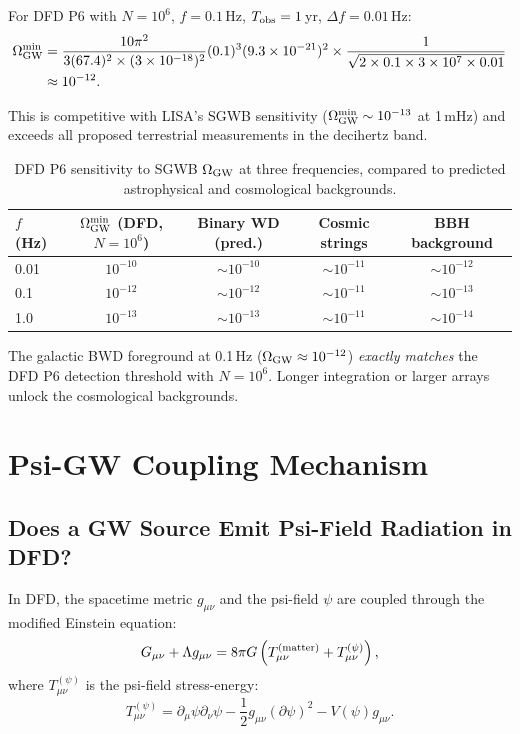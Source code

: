 \documentclass[11pt]{article}
\theoremstyle{definition}
\theoremstyle{remark}
\newcommand{\ee}[1]{\times10^{#1}}
\begin{document}
For DFD P6 with $N=10^6$, $f=0.1$\,Hz, $T_{\rm obs} = 1$\,yr,
$\Delta f = 0.01$\,Hz:
\begin{align}
\Omega_{\rm GW}^{\min} &= \frac{10\pi^2}{3 (67.4)^2 \times (3\ee{-18})^2}
(0.1)^3 (9.3\ee{-21})^2
\times \frac{1}{\sqrt{2 \times 0.1 \times 3\ee{7} \times 0.01}} \notag \\
&\approx 10^{-12}.
\end{align}

This is competitive with LISA's SGWB sensitivity ($\Omega_{\rm GW}^{\min}
\sim 10^{-13}$ at 1\,mHz) and exceeds all proposed terrestrial measurements
in the decihertz band.

\begin{table}[h]
\centering
\caption{DFD P6 sensitivity to SGWB $\Omega_{\rm GW}$ at three frequencies,
compared to predicted astrophysical and cosmological backgrounds.}
\label{tab:SGWB}
\begin{tabular}{@{}lcccc@{}}
\toprule
$f$ (Hz) & $\Omega_{\rm GW}^{\min}$ (DFD, $N=10^6$) & Binary WD (pred.) & Cosmic strings & BBH background \\
\midrule
0.01 & $10^{-10}$ & $\sim 10^{-10}$ & $\sim 10^{-11}$ & $\sim 10^{-12}$ \\
0.1  & $10^{-12}$ & $\sim 10^{-12}$ & $\sim 10^{-11}$ & $\sim 10^{-13}$ \\
1.0  & $10^{-13}$ & $\sim 10^{-13}$ & $\sim 10^{-11}$ & $\sim 10^{-14}$ \\
\bottomrule
\end{tabular}
\end{table}

The galactic BWD foreground at 0.1\,Hz ($\Omega_{\rm GW} \approx 10^{-12}$)
\emph{exactly matches} the DFD P6 detection threshold with $N=10^6$.
Longer integration or larger arrays unlock the cosmological backgrounds.

\section{Psi-GW Coupling Mechanism}
\label{sec:psi-gw-coupling}

\subsection{Does a GW Source Emit Psi-Field Radiation in DFD?}

In DFD, the spacetime metric $g_{\mu\nu}$ and the psi-field $\psi$ are
coupled through the modified Einstein equation:
\begin{equation}
G_{\mu\nu} + \Lambda g_{\mu\nu} = 8\pi G \left(T_{\mu\nu}^{(\rm matter)}
+ T_{\mu\nu}^{(\psi)}\right),
\label{eq:DFD-Einstein}
\end{equation}
where $T_{\mu\nu}^{(\psi)}$ is the psi-field stress-energy:
\begin{equation}
T_{\mu\nu}^{(\psi)} = \partial_\mu\psi \partial_\nu\psi
- \frac{1}{2}g_{\mu\nu}(\partial\psi)^2
- V(\psi) g_{\mu\nu}.
\label{eq:psi-Tmunu}
\end{equation}
\end{document}
